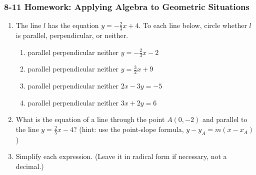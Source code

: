 \documentclass[12pt, twoside]{article}
\begin{document}
\subsubsection*{8-11 Homework: Applying Algebra to Geometric Situations}
  \begin{enumerate}

  \item The line $l$ has the equation $y=-\frac{2}{3}x+4$. To each line below, circle whether $l$ is parallel, perpendicular, or neither.
    \begin{enumerate}
      \item parallel \quad perpendicular \quad neither \qquad $y=-\frac{2}{3}x-2$
      \vspace{0.5cm}
      \item parallel \quad perpendicular \quad neither \qquad $y=\frac{3}{2}x+9$
      \vspace{0.5cm}
      \item parallel \quad perpendicular \quad neither \qquad $2x-3y=-5$
      \vspace{1.5cm}
      \item parallel \quad perpendicular \quad neither \qquad $3x+2y=6$
      \vspace{1.7cm}
    \end{enumerate}

    \item What is the equation of a line through the point $A(0,-2)$ and parallel to the line $y=\frac{2}{5}x-4$? (hint: use the point-slope formula, $y-y_A=m (x-x_A)$) \vspace{2.5cm}

  \item Simplify each expression. (Leave it in radical form if necessary, not a decimal.)
    \begin{enumerate}
    \end{enumerate}
    \vspace{0.5cm}



\end{enumerate}
\end{document}
